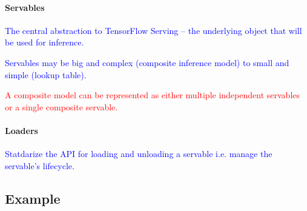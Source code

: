 


\paragraph{Servables}

\textcolor{blue}{The central abstraction to TensorFlow Serving -- the underlying object that will be used for inference.}

\textcolor{blue}{Servables may be big and complex (composite inference model) to small and simple (lookup table). }

\textcolor{red}{A composite model can be represented as either multiple independent servables or a single composite servable.}

\paragraph{Loaders}

\textcolor{blue}{Statdarize the API for loading and unloading a servable i.e. manage the servable's lifecycle.}





\subsection{Example}